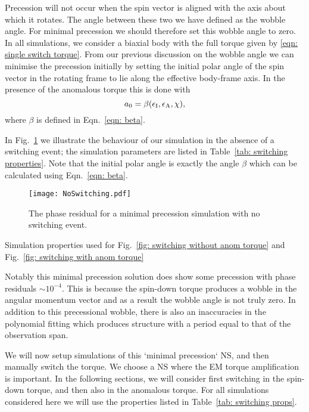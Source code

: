 \documentclass[../full_thesis/full_thesis.tex]{subfiles}
\begin{document}
Precession will not occur when the spin vector is aligned with the axis about
which it rotates. The angle between these two we have defined as the wobble
angle.  For minimal precession we should therefore set this wobble angle to
zero. In all simulations, we consider a biaxial body with the full torque given
by \eqref{eqn: single switch torque}. From our previous discussion on the
wobble angle we can minimise the precession initially by setting the initial polar angle
of the spin vector in the rotating frame to lie along the effective body-frame
axis. In the presence of the anomalous torque this is done with
\begin{equation}
a_{0} = \beta(\epsilon_{\mathrm{I}}, \epsilon_{\mathrm{A}}, \chi),
\end{equation}
where $\beta$ is defined in Eqn.~\ref{eqn: beta}.

In Fig.~\ref{fig: no switching} we illustrate the behaviour of our simulation
in the absence of a switching event; the simulation parameters are listed in
Table~\ref{tab: switching properties}. Note that the initial polar angle is
exactly the angle $\beta$ which can be calculated using Eqn.~\eqref{eqn: beta}.
\begin{figure}[htb]
\texttt{[image: NoSwitching.pdf]}
\caption{The phase residual for a minimal precession simulation with no
         switching event.}
\label{fig: no switching}
\end{figure}
\begin{table}[htb]
\centering

\caption{Simulation properties used for Fig.~\ref{fig: switching without anom torque}
and Fig.~\ref{fig: switching with anom torque}}
\label{tab: switching props}
\end{table}

Notably this minimal precession solution does show some precession with phase
residuals $\sim 10^{-4}$. This is because the spin-down torque produces a wobble
in the angular momentum vector and as a result the wobble angle is not truly
zero. In addition to this precessional wobble, there is also an inaccuracies
in the polynomial fitting which produces structure with a period equal to that
of the observation span.

We will now setup simulations of this `minimal precession` NS, and then
manually switch the torque. We choose a NS where the EM torque amplification is
important.  In the following sections, we will consider first switching in the
spin-down torque, and then also in the anomalous torque. For all simulations
considered here we will use the properties listed in Table~\ref{tab: switching
props}.
\end{document}
